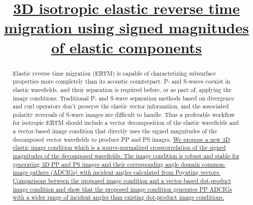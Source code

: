 \documentclass[manuscript,ulem,graphix,revised]{geophysics}
\begin{document}
\title{\uline{3D isotropic elastic reverse time migration using signed magnitudes of elastic components}}
\marginpar{[3]}

%
%
\author{\vspace{-9ex}}


\renewcommand{\figdir}{Fig} %

\begin{abstract}

Elastic reverse time migration (ERTM) is capable of characterizing subsurface properties more completely than its acoustic counterpart. P- and S-waves coexist in elastic wavefields, and their separation is required before, or as part of, applying the image conditions. Traditional P- and S-wave separation methods based on divergence and curl operators don't preserve the elastic vector information, and the associated polarity reversals of S-wave images are difficult to handle. Thus a preferable workflow for isotropic ERTM should include a vector decomposition of the elastic wavefields and a vector-based image condition that directly uses the signed magnitudes of the decomposed vector wavefields to produce PP and PS images. 
\marginpar{[1,4,12]}\uline{We propose a new 3D elastic image condition which is a source-normalized crosscorrelation of the signed magnitudes of the decomposed wavefields.
The image condition is robust and stable for generating 3D PP and PS images and their corresponding angle domain common-image gathers (ADCIGs) with incident angles calculated from Poynting vectors.
Comparisons between the proposed image condition and a vector-based dot-product image condition and show that the proposed image condition generates PP ADCIGs with a wider range of incident angles than existing dot-product image conditions.
}
\end{abstract}
\end{document}
